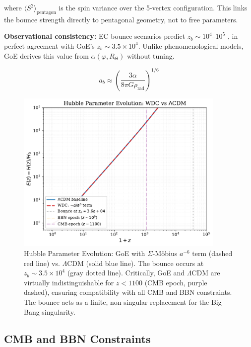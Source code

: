 \documentclass[12pt]{article}
\begin{document}
where $\langle S^2 \rangle_{\text{pentagon}}$ is the spin variance over the 5-vertex configuration. This links the bounce strength directly to pentagonal geometry, not to free parameters.

\textbf{Observational consistency:} EC bounce scenarios predict $z_b \sim 10^4$--$10^5$ \cite{poplawski2010,magueijo2013}, in perfect agreement with GoE's $z_b \sim 3.5 \times 10^4$. Unlike phenomenological models, GoE derives this value from $\alpha(\varphi, R_\Theta)$ without tuning.

\begin{equation}
a_b \approx \left(\frac{3\alpha}{8\pi G \rho_{\text{rad}}}\right)^{1/6}
\end{equation}

\begin{figure}[H]
\centering
\includegraphics[width=0.9\textwidth]{figures/fig_Hz_bounce.pdf}
\caption{Hubble Parameter Evolution: GoE with $\Sigma$-M\"obius $a^{-6}$ term (dashed red line) vs. $\Lambda$CDM (solid blue line). The bounce occurs at $z_b \sim 3.5 \times 10^4$ (gray dotted line). Critically, GoE and $\Lambda$CDM are virtually indistinguishable for $z < 1100$ (CMB epoch, purple dashed), ensuring compatibility with all CMB and BBN constraints. The bounce acts as a finite, non-singular replacement for the Big Bang singularity.}
\label{fig:bounce_comparison}
\end{figure}

\subsection{CMB and BBN Constraints}
\end{document}
